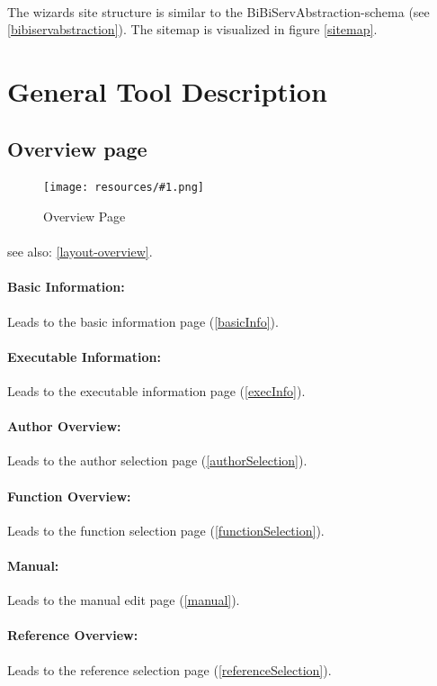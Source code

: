 \documentclass[a4paper,10pt]{book}
\newcommand{\bigpic}[1]{\texttt{[image: resources/\#1.png]}}
\begin{document}
\paragraph{} The wizards site structure is similar to the BiBiServAbstraction-schema (see \ref{bibiservabstraction}). The sitemap is visualized in figure \ref{sitemap}.

\section{General Tool Description}

\subsection{Overview page}
\label{overview}

\begin{figure}
 \bigpic{overview}
 \caption{Overview Page}
\end{figure}

\paragraph{} see also: \ref{layout-overview}.
\paragraph{Basic Information:} Leads to the basic information page (\ref{basicInfo}).
\paragraph{Executable Information:} Leads to the executable information page (\ref{execInfo}).
\paragraph{Author Overview:} Leads to the author selection page (\ref{authorSelection}).
\paragraph{Function Overview:} Leads to the function selection page (\ref{functionSelection}).
\paragraph{Manual:} Leads to the manual edit page (\ref{manual}).
\paragraph{Reference Overview:} Leads to the reference selection page (\ref{referenceSelection}).
\end{document}
